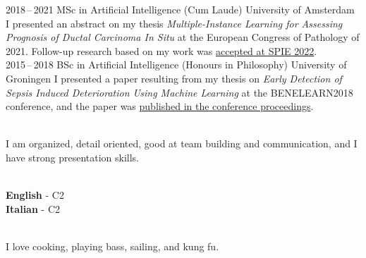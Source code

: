 \documentclass[9pt]{developercv}
\begin{document}
\begin{entrylist}
\entry
    {2018\,--\,2021}
    {MSc in Artificial Intelligence (Cum Laude)}
    {University of Amsterdam}
    {I presented an abstract on my thesis \emph{Multiple-Instance Learning for Assessing Prognosis of Ductal Carcinoma In Situ} at the European Congress of Pathology of 2021. Follow-up research based on my work was \href{https://doi.org/10.1117/12.2612838}{accepted at SPIE 2022}.\\
    }
\entry
    {2015\,--\,2018}
    {BSc in Artificial Intelligence (Honours in Philosophy)}
    {University of Groningen}
    {I presented a paper resulting from my thesis on \emph{Early Detection of Sepsis Induced Deterioration Using Machine Learning} at the BENELEARN2018 conference, and the paper was \href{https://doi.org/10.1007/978-3-030-31978-6_1}{published in the conference proceedings}.\\
    }
\end{entrylist}


\begin{minipage}[t]{0.45\textwidth}
    \vspace{-\baselineskip}
    \\
    I am organized, detail oriented, good at team building and communication, and I have strong presentation skills.
\end{minipage}
\hfill
\begin{minipage}[t]{0.225\textwidth}
    \vspace{-\baselineskip}
    \\
    \textbf{English} - C2\\
    \textbf{Italian} - C2
\end{minipage}
\hfill
\begin{minipage}[t]{0.225\textwidth}
    \vspace{-\baselineskip}
    \\
    I love cooking, playing bass, sailing, and kung fu.
\end{minipage}
\end{document}
